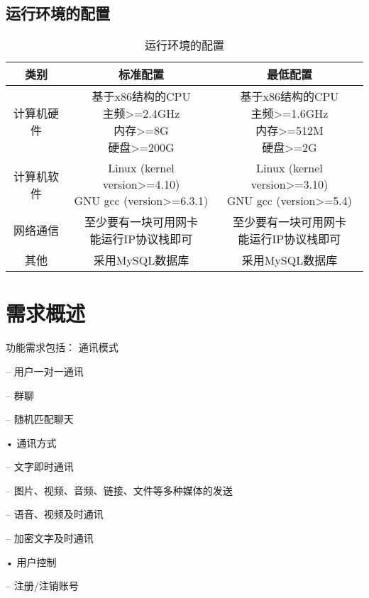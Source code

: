 \subsection{运行环境的配置}
\begin{table}[htbp]
\centering
\caption{运行环境的配置} \label{tab:operation-environment}
\begin{tabular}{|c|c|c|}
    \hline
    类别 & 标准配置 & 最低配置 \\
    \hline
    计算机硬件 & \tabincell{c}{基于x86结构的CPU\\ 主频>=2.4GHz\\ 内存>=8G\\ 硬盘>=200G} & \tabincell{c}{基于x86结构的CPU\\ 主频>=1.6GHz\\ 内存>=512M\\ 硬盘>=2G} \\
    \hline
    计算机软件 & \tabincell{c}{Linux (kernel version>=4.10)\\ GNU gcc (version>=6.3.1)} & \tabincell{c}{Linux (kernel version>=3.10)\\ GNU gcc (version>=5.4)} \\
    \hline
    网络通信 & \tabincell{c}{至少要有一块可用网卡\\ 能运行IP协议栈即可} & \tabincell{c}{至少要有一块可用网卡\\ 能运行IP协议栈即可} \\
    \hline
    其他 & 采用MySQL数据库 & 采用MySQL数据库 \\
    \hline

\end{tabular}
\end{table}

\section{需求概述}
功能需求包括：
通讯模式

– 用户一对一通讯

– 群聊

– 随机匹配聊天

• 通讯方式

– 文字即时通讯

– 图片、视频、音频、链接、文件等多种媒体的发送

– 语音、视频及时通讯

– 加密文字及时通讯

• 用户控制

– 注册/注销账号

